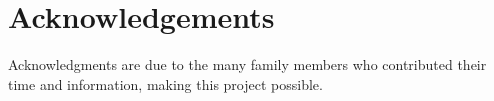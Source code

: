 \chapter{Acknowledgements}
\label{acknowledgements}

Acknowledgments are due to the many family members who contributed their time and information, making this project possible.